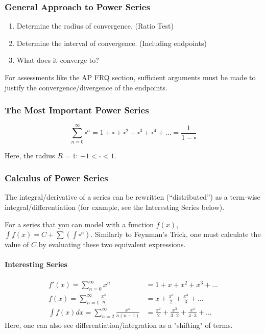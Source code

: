 \documentclass{article}
\begin{document}
\subsubsection{General Approach to Power Series}
\begin{enumerate}
    \item Determine the radius of convergence. (Ratio Test)
    \item Determine the interval of convergence. (Including endpoints)
    \item What does it converge to?
\end{enumerate}
For assessments like the AP FRQ section, sufficient arguments must be made to justify the convergence/divergence of the endpoints.

\subsubsection{The Most Important Power Series}
$$\sum_{n=0}^{\infty} \square^n = 1 + \square + \square^2 + \square^3 + \square^4 + \ldots = \frac{1}{1-\square}$$

Here, the radius $R = 1$: $-1 < \square < 1$.

\subsubsection{Calculus of Power Series}
The integral/derivative of a series can be rewritten (``distributed'') as a term-wise integral/differentiation (for example, see the Interesting Series below).

For a series that you can model with a function $f(x)$, $\int f(x) = C + \sum \left(\int \square^n\right)$. Similarly to Feynman's Trick, one must calculate the value of $C$ by evaluating these two equivalent expressions.

\paragraph{Interesting Series}
\begin{align*}
    f'(x) = \sum_{n=0}^{\infty} x^n &= 1 + x + x^2 + x^3 + \ldots \\
    f(x) = \sum_{n=1}^{\infty} \frac{x^n}{n} &= x + \frac{x^2}{2} + \frac{x^3}{3} + \ldots \\
    \int f(x)dx = \sum_{n=2}^{\infty} \frac{x^n}{n(n-1)} &= \frac{x^2}{2} + \frac{x^3}{3 \cdot 2} + \frac{x^4}{4 \cdot 3} + \ldots
\end{align*}
Here, one can also see differentiation/integration as a "shifting" of terms.
\end{document}
